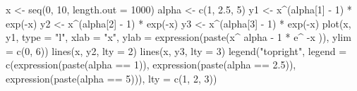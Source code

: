 \begin{Schunk}
\begin{Sinput}
 x <- seq(0, 10, length.out = 1000)
 alpha <- c(1, 2.5, 5)
 y1 <- x^(alpha[1] - 1) * exp(-x)
 y2 <- x^(alpha[2] - 1) * exp(-x)
 y3 <- x^(alpha[3] - 1) * exp(-x)
 plot(x, y1, type = "l", xlab = "x", ylab = expression(paste(x^{
      alpha - 1
  } * e^{
      -x
  })), ylim = c(0, 6))
 lines(x, y2, lty = 2)
 lines(x, y3, lty = 3)
 legend("topright", legend = c(expression(paste(alpha == 1)), expression(paste(alpha == 
      2.5)), expression(paste(alpha == 5))), lty = c(1, 2, 3))
\end{Sinput}
\end{Schunk}
